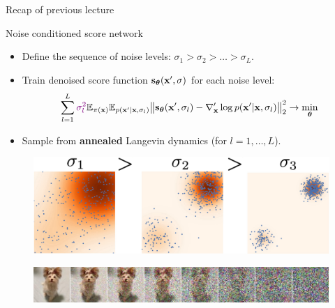 \begin{frame}{Recap of previous lecture}
	\begin{block}{Noise conditioned score network}
		\begin{itemize}
			\item Define the sequence of noise levels: $\sigma_1 > \sigma_2 > \dots > \sigma_L$.
			\item Train denoised score function $\mathbf{s}_{\boldsymbol{\theta}}(\mathbf{x}', \sigma)$ for each noise level:
			\vspace{-0.3cm}
			\[
				\sum_{l=1}^L {\color{violet}\sigma_l^2} \mathbb{E}_{\pi(\mathbf{x})} \mathbb{E}_{p(\mathbf{x}' | \mathbf{x}, \sigma_l)}\bigl\| \mathbf{s}_{\boldsymbol{\theta}}(\mathbf{x}', \sigma_l) - \nabla_{\mathbf{x}}' \log p(\mathbf{x}' | \mathbf{x}, \sigma_l) \bigr\|^2_2 \rightarrow \min_{\boldsymbol{\theta}}
			\]
			\vspace{-0.5cm}
			\item Sample from \textbf{annealed} Langevin dynamics (for $l=1, \dots, L$).
		\end{itemize}
	\end{block}
	\begin{figure}
		\includegraphics[width=0.55\linewidth]{figs/multi_scale}
	\end{figure}
	\begin{figure}
		\includegraphics[width=\linewidth]{figs/duoduo}
	\end{figure}
\end{frame}
